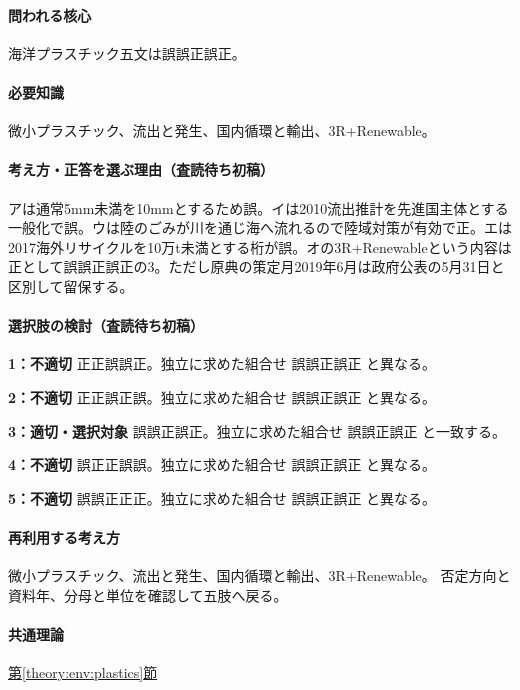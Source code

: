 \paragraph{問われる核心} 海洋プラスチック五文は誤誤正誤正。

\paragraph{必要知識} 微小プラスチック、流出と発生、国内循環と輸出、3R+Renewable。

\paragraph{考え方・正答を選ぶ理由（査読待ち初稿）} アは通常5mm未満を10mmとするため誤。イは2010流出推計を先進国主体とする一般化で誤。ウは陸のごみが川を通じ海へ流れるので陸域対策が有効で正。エは2017海外リサイクルを10万t未満とする桁が誤。オの3R+Renewableという内容は正として誤誤正誤正の3。ただし原典の策定月2019年6月は政府公表の5月31日と区別して留保する。

\paragraph{選択肢の検討（査読待ち初稿）}\mbox{}\par

\noindent\textbf{1：不適切} 正正誤誤正。独立に求めた組合せ 誤誤正誤正 と異なる。\par

\noindent\textbf{2：不適切} 正正誤正誤。独立に求めた組合せ 誤誤正誤正 と異なる。\par

\noindent\textbf{3：適切・選択対象} 誤誤正誤正。独立に求めた組合せ 誤誤正誤正 と一致する。\par

\noindent\textbf{4：不適切} 誤正正誤誤。独立に求めた組合せ 誤誤正誤正 と異なる。\par

\noindent\textbf{5：不適切} 誤誤正正正。独立に求めた組合せ 誤誤正誤正 と異なる。\par

\paragraph{再利用する考え方} 微小プラスチック、流出と発生、国内循環と輸出、3R+Renewable。 否定方向と資料年、分母と単位を確認して五肢へ戻る。

\paragraph{共通理論} \hyperref[theory:env:plastics]{第\ref*{theory:env:plastics}節}

